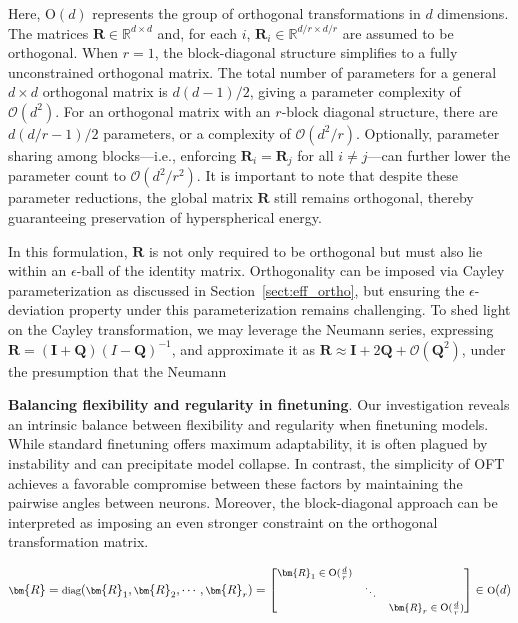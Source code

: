 \begin{itemize}[leftmargin=*,nosep]
Here, $\text{O}(d)$ represents the group of orthogonal transformations in $d$ dimensions. The matrices $\bm{R}\in\mathbb{R}^{d\times d}$ and, for each $i$, $\bm{R}_i\in\mathbb{R}^{d/r\times d/r}$ are assumed to be orthogonal. When $r=1$, the block-diagonal structure simplifies to a fully unconstrained orthogonal matrix. The total number of parameters for a general $d\times d$ orthogonal matrix is $d(d-1)/2$, giving a parameter complexity of $\mathcal{O}(d^2)$. For an orthogonal matrix with an $r$-block diagonal structure, there are $d(d/r-1)/2$ parameters, or a complexity of $\mathcal{O}(d^2/r)$. Optionally, parameter sharing among blocks—i.e., enforcing $\bm{R}_i = \bm{R}_j$ for all $i\neq j$—can further lower the parameter count to $\mathcal{O}(d^2/r^2)$. It is important to note that despite these parameter reductions, the global matrix $\bm{R}$ still remains orthogonal, thereby guaranteeing preservation of hyperspherical energy.

In this formulation, $\bm{R}$ is not only required to be orthogonal but must also lie within an $\epsilon$-ball of the identity matrix. Orthogonality can be imposed via Cayley parameterization as discussed in Section~\ref{sect:eff_ortho}, but ensuring the $\epsilon$-deviation property under this parameterization remains challenging. To shed light on the Cayley transformation, we may leverage the Neumann series, expressing $\bm{R}=(\bm{I}+\bm{Q})(I-\bm{Q})^{-1}$, and approximate it as $\bm{R}\approx\bm{I}+2\bm{Q}+\mathcal{O}(\bm{Q}^2)$, under the presumption that the Neumann

\textbf{Balancing flexibility and regularity in finetuning}. Our investigation reveals an intrinsic balance between flexibility and regularity when finetuning models. While standard finetuning offers maximum adaptability, it is often plagued by instability and can precipitate model collapse. In contrast, the simplicity of OFT achieves a favorable compromise between these factors by maintaining the pairwise angles between neurons. Moreover, the block-diagonal approach can be interpreted as imposing an even stronger constraint on the orthogonal transformation matrix.

\begin{equation}
    \footnotesize
    \bm{R}=\text{diag}(\bm{R}_1,\bm{R}_2,\cdots,\bm{R}_r)=\begin{bmatrix}
    \bm{R}_1\in \text{O}(\frac{d}{r}) &  &\\
    &\ddots & \\
    & & \bm{R}_r\in \text{O}(\frac{d}{r})
    \end{bmatrix}\in \text{O}(d)
\end{equation}


\end{itemize}

